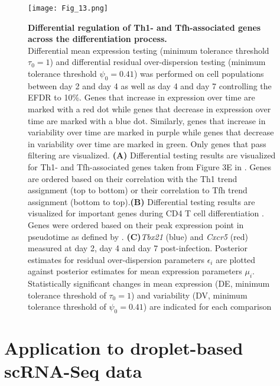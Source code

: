 \begin{figure}[!h]
  \begin{minipage}[c]{0.57\textwidth}
    \texttt{[image: Fig\_13.png]}
  \end{minipage}\hfill
  \begin{minipage}[c]{0.4\textwidth}
\caption[Differential regulation of lineage-associated genes across differentiation]{\textbf{Differential regulation of Th1- and Tfh-associated genes across the differentiation process.}\\
Differential mean expression testing (minimum tolerance threshold $\tau_0=1$) and differential residual over-dispersion testing (minimum tolerance threshold $\psi_0=0.41$) was performed on cell populations between day 2 and day 4 as well as day 4 and day 7 controlling the EFDR to 10\%. Genes that increase in expression over time are marked with a red dot while genes that decrease in expression over time are marked with a blue dot. Similarly, genes that increase in variability over time are marked in purple while genes that decrease in variability over time are marked in green. Only genes that pass filtering are visualized. \textbf{(A)} Differential testing results are visualized for Th1- and Tfh-associated genes taken from Figure 3E in \cite{Lonnberg2017}. Genes are ordered based on their correlation with the Th1 trend assignment (top to bottom) or their correlation to Tfh trend assignment (bottom to top).\textbf{(B)} Differential testing results are visualized for important genes during CD4\plus{} T cell differentiation \citep[taken from Figure 5A in][]{Lonnberg2017}. Genes were ordered based on their peak expression point in pseudotime as defined by \cite{Lonnberg2017}. \textbf{(C)}\textit{Tbx21} (blue) and \textit{Cxcr5} (red) measured at day 2, day 4 and day 7 post-infection. Posterior estimates for residual over-dispersion parameters $\epsilon_i$ are plotted against posterior estimates for mean expression parameters $\mu_i$. Statistically significant changes in mean expression (DE, minimum tolerance threshold of $\tau_0=1$) and variability (DV, minimum tolerance threshold of $\psi_0=0.41$) are indicated for each comparison} \label{fig2:immune_differentiation2}
  \end{minipage}
\end{figure}

\newpage

\section{Application to droplet-based scRNA-Seq data}

